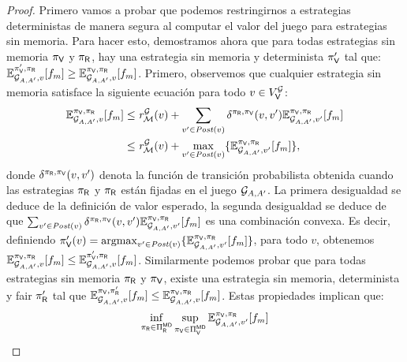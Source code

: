 \noindent
\begin{proof}
Primero vamos a probar que podemos restringirnos a estrategias deterministas de manera segura al computar el valor del juego para estrategias sin memoria.  Para hacer esto, demostramos ahora que para todas estrategias sin memoria $\pi_{\mathsf{V}}$ y $\pi_{\mathsf{R}}$, hay una estrategia sin memoria y determinista
$\pi_{\mathsf{V}}'$ tal que: $\mathbb{E}^{\pi_{\mathsf{V}}',\pi_{\mathsf{R}}}_{\mathcal{G}_{A,A'}, v}[f_{m}]  \geq \mathbb{E}^{\pi_{\mathsf{V}},\pi_{\mathsf{R}}}_{\mathcal{G}_{A,A'}, v}[f_{m}]$. Primero, observemos que cualquier estrategia sin memoria satisface la siguiente ecuación para todo $v \in V^{\mathcal{G}}_{\mathsf{V}}$:
\begin{align}
    \mathbb{E}_{\mathcal{G}_{A,A'},v}^{\pi_{\mathsf{V}},\pi_{\mathsf{R}}}[f_{m}]&  \leq \mathit{r}_{\mathcal{M}}^{\mathcal{G}}(v) + \sum_{v' \in \mathit{Post}(v)} \delta^{\pi_{\mathsf{R}},\pi_{\mathsf{V}}}(v,v')  \mathbb{E}_{\mathcal{G}_{A,A'},v'}^{\pi_{\mathsf{V}},\pi_{\mathsf{R}}}[f_{m}] \label{theo:det-fairness:eq3:l1}\\
    & \leq \mathit{r}_{\mathcal{M}}^{\mathcal{G}}(v)  + \max_{v' \in \mathit{Post}(v)} \{  \mathbb{E}_{\mathcal{G}_{A,A'},v'}^{\pi_{\mathsf{V}},\pi_{\mathsf{R}}}[f_{m}] \},
    \label{theo:det-fairness:eq3:l12}
\end{align}
\sloppy donde $\delta^{\pi_{\mathsf{R}},\pi_{\mathsf{V}}}(v,v')$ denota la función de transición probabilista obtenida cuando las estrategias $\pi_{\mathsf{R}}$ y $\pi_{\mathsf{R}}$
están fijadas en el juego $\mathcal{G}_{A,A'}$. La primera desigualdad se deduce de la definición de valor esperado, la segunda desigualdad se deduce de que $ \sum_{v' \in \mathit{Post}(v)} \delta^{\pi_{\mathsf{R}},\pi_{\mathsf{V}}}(v,v') \mathbb{E}_{\mathcal{G}_{A,A'},v'}^{\pi_{\mathsf{V}},\pi_{\mathsf{R}}}[f_{m}] $ es una combinación convexa. Es decir,  definiendo $\pi_{\mathsf{V}}'(v) = \operatorname*{argmax}_{v' \in \mathit{Post}(v)}  \{ \mathbb{E}_{\mathcal{G}_{A,A'},v'}^{\pi_{\mathsf{V}},\pi_{\mathsf{R}}}[f_{m}] \}$, para todo $v$,  obtenemos
$\mathbb{E}_{\mathcal{G}_{A,A'},v}^{\pi_{\mathsf{V}},\pi_{\mathsf{R}}}[f_{m}] \leq \mathbb{E}_{\mathcal{G}_{A,A'},v}^{\pi_{\mathsf{V}}',\pi_{\mathsf{R}}}[f_{m}]$. 
Similarmente podemos probar que para todas estrategias sin memoria $\pi_{\mathsf{R}}$ y $\pi_{\mathsf{V}}$, existe una estrategia sin memoria, determinista y fair 
$\pi_{\mathsf{R}}'$ tal que  $\mathbb{E}_{\mathcal{G}_{A,A'},v}^{\pi_{\mathsf{V}},\pi_{\mathsf{R}}'}[f_{m}] \leq \mathbb{E}_{\mathcal{G}_{A,A'},v}^{\pi_{\mathsf{V}},\pi_{\mathsf{R}}}[f_{m}]$.  Estas propiedades implican que:
\[
    \inf_{\pi_{\mathsf{R}} \in \Pi_{\mathsf{R}}^{\mathsf{M}\mathsf{D}}}  \sup_{\pi_{\mathsf{V}} \in \Pi_{\mathsf{V}}^{\mathsf{M}\mathsf{D}}} \mathbb{E}_{\mathcal{G}_{A,A'},v'}^{\pi_{\mathsf{V}},\pi_{\mathsf{R}}}[f_{m}] 
\]
\end{proof}
